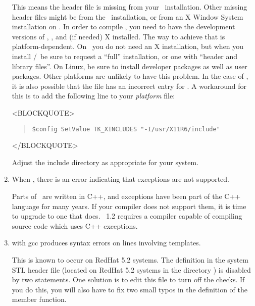 \begin{enumerate}
This means the header file  is missing from your
\Tcl\ installation.  Other missing header files might be
 from the \Tk\ installation, or  from an
X Window System installation on \Unix.  In order to compile \OOMMF, you
need to have the development versions of \Tcl, \Tk, and (if needed) X
installed.  The way to achieve that is platform-dependent.  On \Windows\
you do not need an X installation, but when you install \Tcl/\Tk\ be
sure to request a ``full'' installation, or one with ``header and
library files''.  On Linux, be sure to install developer packages
as well as user packages.  Other
platforms are unlikely to have this problem.  In the case of
, it is also possible that the  file has an
incorrect entry for \cd{TK\_XINCLUDES}.  A workaround for this is to
add the following line to your
\textit{platform} file:
\begin{rawhtml}<BLOCKQUOTE>\end{rawhtml}
\begin{quote}
\begin{verbatim}
$config SetValue TK_XINCLUDES "-I/usr/X11R6/include"
\end{verbatim}
\end{quote}
\begin{rawhtml}</BLOCKQUOTE>\end{rawhtml}
Adjust the include directory as appropriate for your system.

\item When
, there is an error
indicating that exceptions are not supported.

Parts of \OOMMF\ are written in C++, and exceptions have been part
of the C++ language for many years.  If your compiler does not
support them, it is time to upgrade to one that does.  \OOMMF\ 1.2
requires a compiler capable of compiling source code which uses
C++ exceptions.

\item {} with gcc produces syntax errors
on lines involving  templates.

This is known to occur on RedHat 5.2 systems.  The 
definition in the system STL header file \cd{memory} (located on RedHat
5.2 systems in the directory \cd{/usr/include/g++}) is disabled by two
 statements.  One solution is to edit this file to turn off
the \cd{\lb if} checks.  If you do this, you will also have to fix two
small typos in the definition of the \cd{release()} member function.


\end{enumerate}
